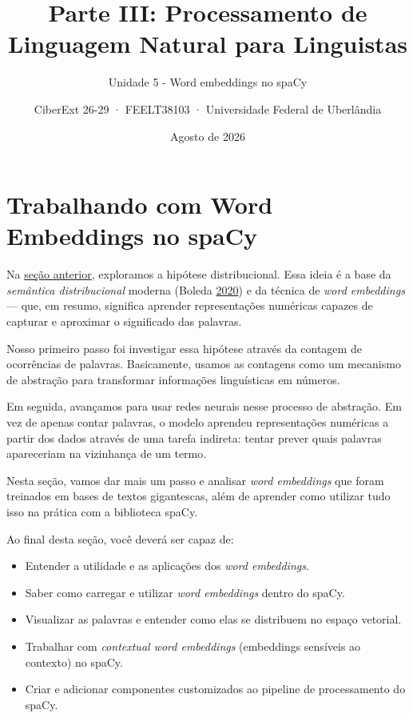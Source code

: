\documentclass[
  brazilian,
]{article}
\title{Parte III: Processamento de Linguagem Natural para Linguistas}
\subtitle{Unidade 5 - Word embeddings no spaCy}
\author{CiberExt 26-29 · FEELT38103 · Universidade Federal de
Uberlândia}
\date{Agosto de 2026}
\providecommand{\tightlist}{%
  \setlength{\itemsep}{0pt}\setlength{\parskip}{0pt}}
\begin{document}
\maketitle

\hypertarget{trabalhando-com-word-embeddings-no-spacy}{%
\section{Trabalhando com Word Embeddings no
spaCy}\label{trabalhando-com-word-embeddings-no-spacy}}

Na \href{../unidade_4/introducao_word_embeddings.html}{seção anterior},
exploramos a hipótese distribucional. Essa ideia é a base da
\emph{semântica distribucional} moderna (Boleda
\href{https://doi.org/10.1146/annurev-linguistics-011619-030303}{2020})
e da técnica de \emph{word embeddings} --- que, em resumo, significa
aprender representações numéricas capazes de capturar e aproximar o
significado das palavras.

Nosso primeiro passo foi investigar essa hipótese através da contagem de
ocorrências de palavras. Basicamente, usamos as contagens como um
mecanismo de abstração para transformar informações linguísticas em
números.

Em seguida, avançamos para usar redes neurais nesse processo de
abstração. Em vez de apenas contar palavras, o modelo aprendeu
representações numéricas a partir dos dados através de uma tarefa
indireta: tentar prever quais palavras apareceriam na vizinhança de um
termo.

Nesta seção, vamos dar mais um passo e analisar \emph{word embeddings}
que foram treinados em bases de textos gigantescas, além de aprender
como utilizar tudo isso na prática com a biblioteca spaCy.

Ao final desta seção, você deverá ser capaz de:

\begin{itemize}
\tightlist
\item
  Entender a utilidade e as aplicações dos \emph{word embeddings}.
\item
  Saber como carregar e utilizar \emph{word embeddings} dentro do spaCy.
\item
  Visualizar as palavras e entender como elas se distribuem no espaço
  vetorial.
\item
  Trabalhar com \emph{contextual word embeddings} (embeddings sensíveis
  ao contexto) no spaCy.
\item
  Criar e adicionar componentes customizados ao pipeline de
  processamento do spaCy.
\end{itemize}
\end{document}
